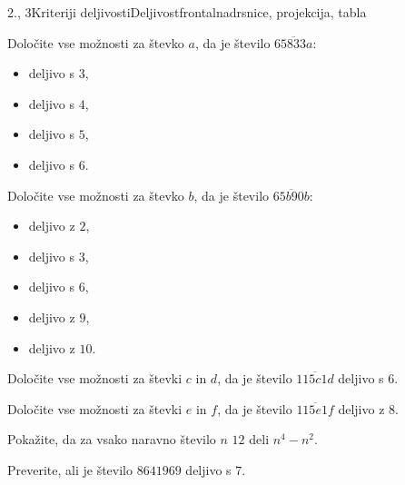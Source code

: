 \begin{priprava}{2., 3}{}{Kriteriji deljivosti}{Deljivost}{frontalna}{drsnice, projekcija, tabla}
    \begin{naloga}
        Določite vse možnosti za števko $a$, da je število $\overline{65833a}$:
        \begin{itemize}
            \item deljivo s $3$, 
            \item deljivo s $4$, 
            \item deljivo s $5$, 
            \item deljivo s $6$. 
        \end{itemize}
    \end{naloga}



    \begin{naloga}
        Določite vse možnosti za števko $b$, da je število $\overline{65b90b}$:
        \begin{itemize}
            \item deljivo z $2$, 
            \item deljivo s $3$, 
            \item deljivo s $6$, 
            \item deljivo z $9$, 
            \item deljivo z $10$. 
        \end{itemize}
    \end{naloga}



    \begin{naloga}
        Določite vse možnosti za števki $c$ in $d$, da je število $\overline{115c1d}$ deljivo s $6$.
        
    \end{naloga}

    \begin{naloga}
        Določite vse možnosti za števki $e$ in $f$, da je število $\overline{115e1f}$ deljivo z $8$.
        
    \end{naloga}





    \begin{naloga}
        Pokažite, da za vsako naravno število $n$ $12$ deli $n^4-n^2$.
        
    \end{naloga}

    \begin{naloga}
        Preverite, ali je število $8641 969$ deljivo s $7$.
        
    \end{naloga}
            
 


\end{priprava}
